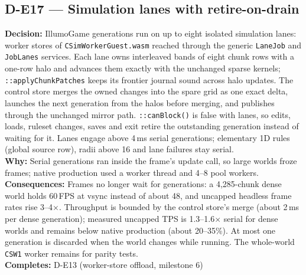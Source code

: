 \subsection*{D-E17 --- Simulation lanes with retire-on-drain}
\begin{decisionbox}[title={D-E17 \quad 2026-09-22}]
\textbf{Decision:} IllumoGame generations run on up to eight isolated
simulation lanes: worker stores of \texttt{CSimWorkerGuest.wasm} reached
through the generic \texttt{LaneJob} and \texttt{JobLanes} services. Each lane
owns interleaved bands of eight chunk rows with a one-row halo and advances
them exactly with the unchanged sparse kernels;
\texttt{::applyChunkPatches} keeps its frontier
journal sound across halo updates. The control store merges the owned changes
into the spare grid as one exact delta, launches the next generation from the
halos before merging, and publishes through the unchanged mirror path.
\texttt{::canBlock()} is false with lanes, so
edits, loads, ruleset changes, saves and exit retire the outstanding
generation instead of waiting for it. Lanes engage above 4\,ms serial
generations; elementary 1D rules (global source row), radii above 16 and lane
failures stay serial.\\
\textbf{Why:} Serial generations ran inside the frame's update call, so large
worlds froze frames; native production used a worker thread and 4--8 pool
workers.\\
\textbf{Consequences:} Frames no longer wait for generations: a
4,285-chunk dense world holds 60\,FPS at vsync instead of about 48, and
uncapped headless frame rates rise 3--4$\times$. Throughput is bounded by the control
store's merge (about 2\,ms per dense generation); measured uncapped TPS is
1.3--1.6$\times$ serial for dense worlds and remains below native production
(about 20--35\%). At most one generation is discarded when the world changes
while running. The whole-world \texttt{CSW1} worker remains for parity tests.\\
\textbf{Completes:} D-E13 (worker-store offload, milestone 6)
\end{decisionbox}

